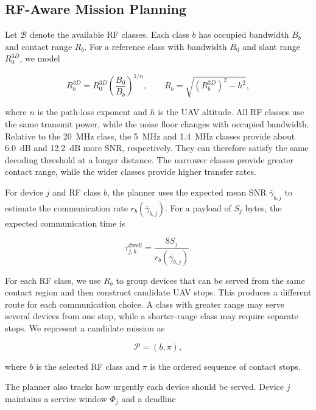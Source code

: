 \documentclass[conference]{IEEEtran}
\begin{document}
\subsection{RF-Aware Mission Planning}
\label{sec:mission-planning}

Let $\mathcal{B}$ denote the available RF classes. Each class $b$ has occupied
bandwidth $B_b$ and contact range $R_b$. For a reference class with bandwidth
$B_0$ and slant range $R_0^{3D}$, we model

\begin{equation}
R_b^{3D}
=
R_0^{3D}
\left(\frac{B_0}{B_b}\right)^{1/n},
\qquad
R_b =
\sqrt{\left(R_b^{3D}\right)^2-h^2},
\label{eq:contact-range}
\end{equation}

where $n$ is the path-loss exponent and $h$ is the UAV altitude. All RF classes
use the same transmit power, while the noise floor changes with occupied
bandwidth. Relative to the 20~MHz class, the 5~MHz and 1.4~MHz classes provide
about 6.0~dB and 12.2~dB more SNR, respectively. They can therefore satisfy the
same decoding threshold at a longer distance. The narrower classes provide
greater contact range, while the wider classes provide higher transfer rates.

For device $j$ and RF class $b$, the planner uses the expected mean SNR
$\bar{\gamma}_{b,j}$ to estimate the communication rate
$r_b(\bar{\gamma}_{b,j})$. For a payload of $S_j$ bytes, the expected
communication time is

\begin{equation}
\tau_{j,b}^{\mathrm{dwell}}
=
\frac{8S_j}{r_b(\bar{\gamma}_{b,j})}.
\label{eq:dwell}
\end{equation}

For each RF class, we use $R_b$ to group devices that can be served from the
same contact region and then construct candidate UAV stops. This produces a
different route for each communication choice. A class with greater range may
serve several devices from one stop, while a shorter-range class may require
separate stops. We represent a candidate mission as

\begin{equation}
\mathcal{P}=(b,\pi),
\end{equation}

where $b$ is the selected RF class and $\pi$ is the ordered sequence of contact
stops.

The planner also tracks how urgently each device should be served. Device $j$
maintains a service window $\Phi_j$ and a deadline
\end{document}

